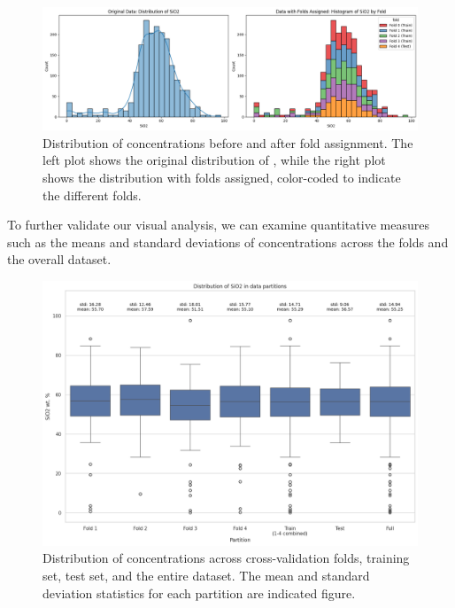 \begin{figure}[h!]
    \centering
    \includegraphics[width=\textwidth]{images/original_and_post_fold.png}
    \caption{Distribution of  concentrations before and after fold assignment. The left plot shows the original distribution of , while the right plot shows the distribution with folds assigned, color-coded to indicate the different folds.}
    \label{fig:original_and_post_fold_plot}
\end{figure}


To further validate our visual analysis, we can examine quantitative measures such as the means and standard deviations of  concentrations across the folds and the overall dataset.

\begin{figure}[htbp]
    \centering
    \includegraphics[width=\textwidth]{images/distribution_plot.png}
    \caption{Distribution of  concentrations across cross-validation folds, training set, test set, and the entire dataset. The mean and standard deviation statistics for each partition are indicated figure.}
    \label{fig:siO2_distribution}
\end{figure}

